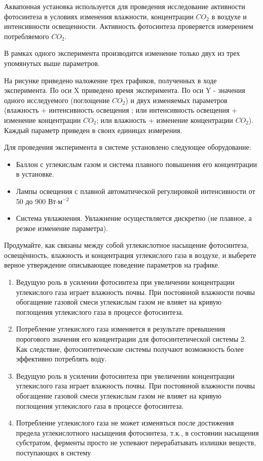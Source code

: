 
Аквапонная установка используется для проведения  исследование активности фотосинтеза в условиях 
изменения влажности, концентрации $CO_2$ в воздухе и интенсивности освещенности. Активность фотосинтеза проверяется измерением потребляемого $CO_2$.

В рамках одного эксперимента производится изменение только двух из трех упомянутых выше параметров.  

На рисунке приведено наложение трех графиков, полученных в ходе эксперимента. По оси X приведено время эксперимента. По оси Y - значения одного исследуемого (поглощение $CO_2$) и двух изменяемых параметров (влажность + интенсивность освещения ; или интенсивность освещения + изменение концентрации $CO_2$; или влажность + изменение концентрации $CO_2$). Каждый параметр приведен в своих единицах измерения.

Для проведения эксперимента в системе установлено следующее оборудование:

\begin{itemize}
    \item Баллон с углекислым газом и система плавного повышения его концентрации в установке.
    \item Лампы освещения с плавной автоматической регулировкой интенсивности от 50 до 900 Вт$\cdot$м$^{-2}$
    \item Система увлажнения. Увлажнение осуществляется дискретно (не плавное, а резкое изменение параметра).
\end{itemize}

Продумайте, как связаны между собой углекислотное насыщение фотосинтеза, освещённость, влажность и концентрация углекислого газа в воздухе, и выберете верное утверждение описывающее поведение параметров на графике.


\begin{enumerate}
    \item Ведущую роль в усилении фотосинтеза при увеличении концентрации углекислого газа играет влажность почвы. При постоянной влажности почвы обогащение газовой смеси углекислым газом не влияет на кривую поглощения углекислого газа в процессе фотосинтеза.
    \item Потребление углекислого газа изменяется в результате превышения порогового значения его концентрации для фотосинтетической системы 2. Как следствие, фотосинтетические системы получают возможность более эффективно потреблять воду.
    \item Ведущую роль в усилении фотосинтеза при увеличении концентрации углекислого газа играет влажность почвы. При постоянной влажности почвы обогащение газовой смеси углекислым газом не влияет на кривую поглощения углекислого газа в процессе фотосинтеза.
    \item Потребление углекислого газа не может изменяться после достижения предела углекислотного насыщения фотосинтеза, т.к., в состоянии насыщения субстратом, ферменты просто не успевают перерабатывать излишки веществ, поступающих в систему
\end{enumerate}

